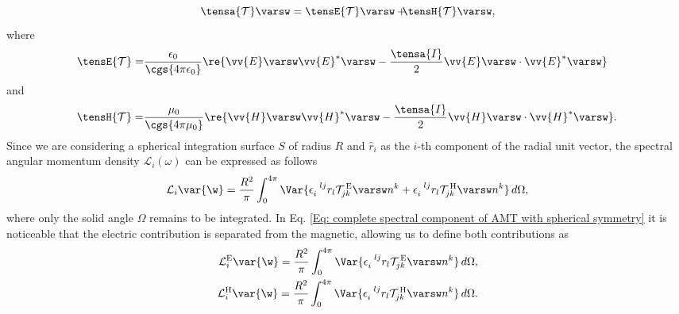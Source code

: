 \begin{equation}
\tensa{\mathcal{T}}\varsw = \tensE{\mathcal{T}}\varsw+\hspace{-0.2 cm}\tensH{\mathcal{T}}\varsw, 
\end{equation}
where
\begin{align}
\tensE{\mathcal{T}}=& \frac{\epsilon_0}{\cgs{4\pi\epsilon_0}} \re{\vv{E}\varsw \vv{E}^{*}\varsw - \frac{\tensa{I}}{2} \vv{E}\varsw\cdot\vv{E}^{*}\varsw}
\end{align}
and
\begin{align}
\hspace{0.3 cm}\tensH{\mathcal{T}}=& \frac{\mu_0}{\cgs{4\pi\mu_0}} \re{\vv{H}\varsw \vv{H}^{*}\varsw - \frac{\tensa{I}}{2} \vv{H}\varsw\cdot\vv{H}^{*}\varsw}.
\end{align}
%
Since we are considering a spherical integration surface $S$ of radius $R$ and $\hat{r}_i$ as the $i$-th component of the radial unit vector, the spectral angular momentum density $\mathcal{L}_i(\omega)$ can be expressed as follows
\begin{equation}
\mathcal{L}_i\var{\w} = \frac{R^2}{\pi} \int_0^{4\pi} \Var{\epsilon_{i}^{\,\,\,\, lj} r_l \mathcal{T}^{\, \rm E}_{jk}\varsw n^k + \epsilon_{i}^{\,\,\,\, lj} r_l \mathcal{T}^{\, \rm H}_{jk}\varsw n^k}\,d\Omega,
\label{Eq: complete spectral component of AMT with spherical symmetry}
\end{equation}
where only the solid angle $\Omega$ remains to be integrated. In Eq. \eqref{Eq: complete spectral component of AMT with spherical symmetry} it is noticeable that the electric contribution is separated from the magnetic, allowing us to define both contributions as
\begin{align}
\mathcal{L}_i^{\rm E}\var{\w} = \frac{R^2}{\pi} \int_0^{4\pi} \Var{\epsilon_{i}^{\,\,\,\, lj} r_l \mathcal{T}^{\,\rm E}_{jk}\varsw n^k}\,d\Omega, \\
\mathcal{L}_i^{\rm H}\var{\w} = \frac{R^2}{\pi} \int_0^{4\pi} \Var{\epsilon_{i}^{\,\,\,\, lj} r_l \mathcal{T}^{\,\rm H}_{jk}\varsw n^k}\,d\Omega.
\end{align}


